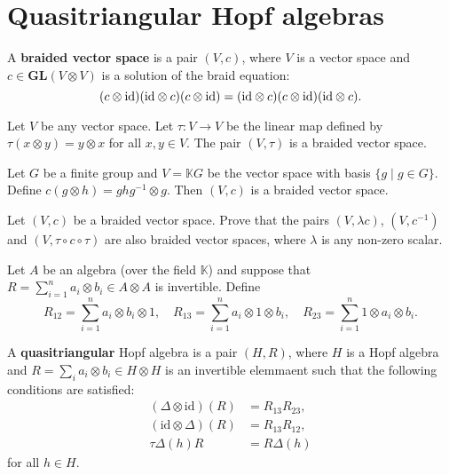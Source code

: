 \section{Quasitriangular Hopf algebras}


\begin{definition}
A \textbf{braided vector space} is a pair $\left(V,c\right)$, where
$V$ is a vector space and $c\in\mathbf{GL}(V\otimes V)$ is a solution
of the braid equation:
\[
(c\otimes\mathrm{id})(\mathrm{id}\otimes c)(c\otimes\mathrm{id})=(\mathrm{id}\otimes c)(c\otimes\mathrm{id})(\mathrm{id}\otimes c).
\]
\end{definition}

\begin{example}
Let $V$ be any vector space. Let $\tau:V\to V$ be the linear map
defined by $\tau(x\otimes y)=y\otimes x$ for all $x,y\in V$. The
pair $(V,\tau)$ is a braided vector space. 
\end{example}

\begin{example}
Let $G$ be a finite group and $V=\mathbb{K}G$ be the vector space
with basis $\{g\mid g\in G\}$. Define $c(g\otimes h)=ghg^{-1}\otimes g$.
Then $(V,c)$ is a braided vector space.
\end{example}

\begin{exercise}
Let $(V,c)$ be a braided vector space. Prove that the pairs $(V,\lambda c)$,
$(V,c^{-1})$ and $(V,\tau\circ c\circ\tau)$ are also braided vector
spaces, where $\lambda$ is any non-zero scalar.
\end{exercise}


Let $A$ be an algebra (over the field $\mathbb{K}$) and suppose
that $R=\sum_{i=1}^{n}a_{i}\otimes b_{i}\in A\otimes A$ is invertible.
Define 
\[
R_{12}=\sum_{i=1}^{n}a_{i}\otimes b_{i}\otimes1,\quad R_{13}=\sum_{i=1}^{n}a_{i}\otimes1\otimes b_{i},\quad R_{23}=\sum_{i=1}^{n}1\otimes a_{i}\otimes b_{i}.
\]

\begin{definition}
A \textbf{quasitriangular} Hopf algebra is a pair $(H,R)$, where
$H$ is a Hopf algebra and $R=\sum_{i}a_{i}\otimes b_{i}\in H\otimes H$
is an invertible elemmaent such that the following conditions are satisfied:
\begin{align}
(\Delta\otimes\textrm{id})(R) & =R_{13}R_{23},\label{QT:2}\\
(\textrm{id}\otimes\Delta)(R) & =R_{13}R_{12},\label{QT:3}\\
\tau\Delta(h)R & =R\Delta(h)\label{QT:1}
\end{align}
for all $h\in H$.
\end{definition}

